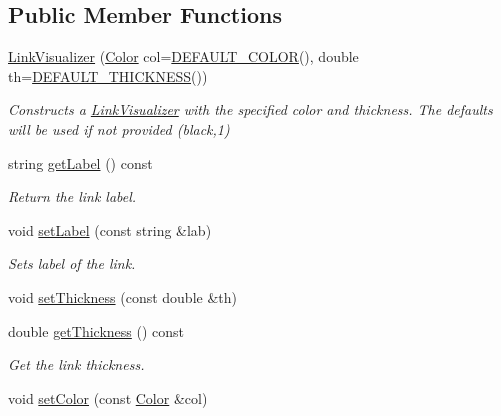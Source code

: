 \subsection*{Public Member Functions}
\begin{DoxyCompactItemize}
\item 
\hyperlink{classbridges_1_1datastructure_1_1_link_visualizer_ae910a1d6f13a3807b025c2c94231d7c8}{Link\+Visualizer} (\hyperlink{classbridges_1_1datastructure_1_1_color}{Color} col=\hyperlink{classbridges_1_1datastructure_1_1_link_visualizer_aa42e1a41ab0332c2e50e1a21068b2533}{D\+E\+F\+A\+U\+L\+T\+\_\+\+C\+O\+L\+OR}(), double th=\hyperlink{classbridges_1_1datastructure_1_1_link_visualizer_a3b23cb9f5ab2dd564fcc4d974e3753f8}{D\+E\+F\+A\+U\+L\+T\+\_\+\+T\+H\+I\+C\+K\+N\+E\+SS}())
\begin{DoxyCompactList}\small\item\em Constructs a \hyperlink{classbridges_1_1datastructure_1_1_link_visualizer}{Link\+Visualizer} with the specified color and thickness. The defaults will be used if not provided (black,1) \end{DoxyCompactList}\item 
string \hyperlink{classbridges_1_1datastructure_1_1_link_visualizer_ae25654272ef1613555c7257e5f184462}{get\+Label} () const
\begin{DoxyCompactList}\small\item\em Return the link label. \end{DoxyCompactList}\item 
void \hyperlink{classbridges_1_1datastructure_1_1_link_visualizer_a20ed50bf0e02f79dda0cb54c3af722fe}{set\+Label} (const string \&lab)
\begin{DoxyCompactList}\small\item\em Sets label of the link. \end{DoxyCompactList}\item 
void \hyperlink{classbridges_1_1datastructure_1_1_link_visualizer_acac8af8117ea32ccc1c3bf9843db9881}{set\+Thickness} (const double \&th)
\item 
double \hyperlink{classbridges_1_1datastructure_1_1_link_visualizer_ab8141d3139ea486fceef41df8d61291d}{get\+Thickness} () const
\begin{DoxyCompactList}\small\item\em Get the link thickness. \end{DoxyCompactList}\item 
void \hyperlink{classbridges_1_1datastructure_1_1_link_visualizer_aef9811c2aae77e86f601654a17ce2f87}{set\+Color} (const \hyperlink{classbridges_1_1datastructure_1_1_color}{Color} \&col)

\end{DoxyCompactItemize}
